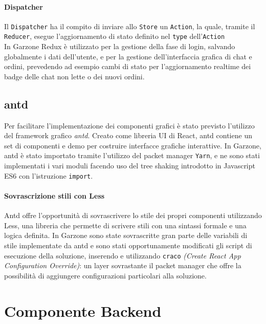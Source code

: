 \paragraph{Dispatcher} Il \lstinline[basicstyle=\ttfamily]!Dispatcher! ha il compito di inviare allo \lstinline[basicstyle=\ttfamily]!Store! un \lstinline[basicstyle=\ttfamily]!Action!, la quale, tramite il \lstinline[basicstyle=\ttfamily]!Reducer!, esegue l'aggiornamento di stato definito nel \lstinline[basicstyle=\ttfamily]!type! dell'\lstinline[basicstyle=\ttfamily]!Action!
\\[12pt]
In Garzone Redux è utilizzato per la gestione della fase di login, salvando globalmente i dati dell'utente, e per la gestione dell'interfaccia grafica di chat e ordini, prevedendo ad esempio cambi di stato per l'aggiornamento realtime dei badge delle chat non lette o dei nuovi ordini.
\subsection{antd}
Per facilitare l'implementazione dei componenti grafici è stato previsto l'utilizzo del framework grafico \textit{antd}. Creato come libreria UI di React, antd contiene un set di componenti e demo per costruire interfacce grafiche interattive\cite{ANTD}. In Garzone, antd è stato importato tramite l'utilizzo del packet manager \lstinline[basicstyle=\ttfamily]!Yarn!, e ne sono stati implementati i vari moduli facendo uso del tree shaking introdotto in Javascript ES6 con l'istruzione \lstinline[basicstyle=\ttfamily]!import!.
\paragraph{Sovrascrizione stili con Less} Antd offre l'opportunità di sovrascrivere lo stile dei propri componenti utilizzando Less, una libreria che permette di scrivere stili con una sintassi formale e una logica definita. In Garzone sono state sovrascritte gran parte delle variabili di stile implementate da antd e sono stati opportunamente modificati gli script di esecuzione della soluzione, inserendo e utilizzando \lstinline[basicstyle=\ttfamily]!craco! \textit{(Create React App Configuration Override)}: un layer sovrastante il packet manager che offre la possibilità di aggiungere configurazioni particolari alla soluzione. 
\newpage
\section{Componente Backend}
